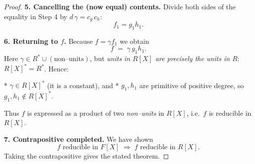 \documentclass[12pt]{article}
\theoremstyle{definition} %
\theoremstyle{plain} %
\begin{document}
\begin{proof}
  \medskip
  \textbf{5.  Cancelling the (now equal) contents.}
  Divide both sides of the equality in Step 4 by \(d\,\gamma=c_g\,c_h\):
  \[
     f_1 = g_1h_1.
  \]
  
  \medskip
  \textbf{6.  Returning to \(f\).}
  Because \(f=\gamma f_1\) we obtain
  \[
     f \;=\; \gamma\,g_1h_1.
  \]
  Here \(\gamma\in R^{\!*}\cup(\text{non–units})\), but
  \emph{units in \(R[X]\) are precisely the units in \(R\)}:
  \(R[X]^{\!*}=R^{\!*}\).
  Hence:
  
  * \(\gamma\in R[X]^{\!*}\) (it is a constant), and  
  * \(g_1,h_1\) are primitive of positive degree, so
    \(g_1,h_1\notin R[X]^{\!*}\).
  
  Thus \(f\) is expressed as a product of two \emph{non–units} in \(R[X]\),
  i.e.\ \(f\) is reducible in \(R[X]\).
  
  \medskip
  \textbf{7.  Contrapositive completed.}
  We have shown
  \[
     f\text{ reducible in }F[X] \;\Longrightarrow\;
     f\text{ reducible in }R[X].
  \]
  Taking the contrapositive gives the stated theorem.
  \end{proof}
\end{document}
